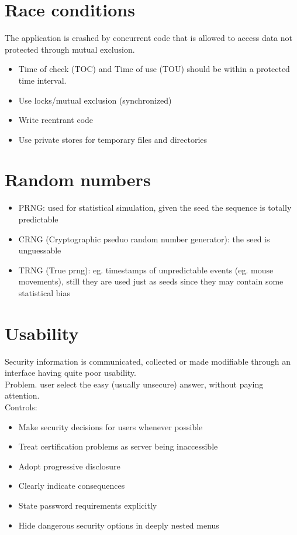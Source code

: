 \documentclass[10pt,a4paper]{book}
\begin{document}
\section{Race conditions}
The application is crashed by concurrent code that is allowed to access data not protected through mutual exclusion.
\begin{itemize}
\item Time of check (TOC) and Time of use (TOU) should be within a protected time interval.
\item Use locks/mutual exclusion (synchronized)
\item Write reentrant code
\item Use private stores for temporary files and directories
\end{itemize}
\section{Random numbers}
\begin{itemize}
\item PRNG: used for statistical simulation, given the seed the sequence is totally predictable
\item CRNG (Cryptographic pseduo random number generator): the seed is unguessable
\item TRNG (True prng): eg. timestamps of unpredictable events (eg. mouse movements), still they are used just as seeds since they may contain some statistical bias
\end{itemize}
\section{Usability}
Security information is communicated, collected or made modifiable through an interface having quite poor usability.\\
Problem. user select the easy (usually unsecure) answer, without paying attention.\\
Controls:
\begin{itemize}
\item Make security decisions for users whenever possible
\item Treat certification problems as server being inaccessible
\item Adopt progressive disclosure
\item Clearly indicate consequences
\item State password requirements explicitly
\item Hide dangerous security options in deeply nested menus
\end{itemize}
\end{document}
